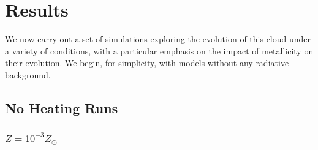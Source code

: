 \documentclass[useAMS,usenatbib]{mn2e}
\begin{document}
\section{Results}
\label{sec:results}

We now carry out a set of simulations exploring the evolution of this cloud under a variety of conditions, with a particular emphasis on the impact of metallicity on their evolution.  We begin, for simplicity, with models without any radiative background.


\subsection{No Heating Runs}

\subsubsection{$Z=10^{-3}Z_\odot$}
\end{document}
